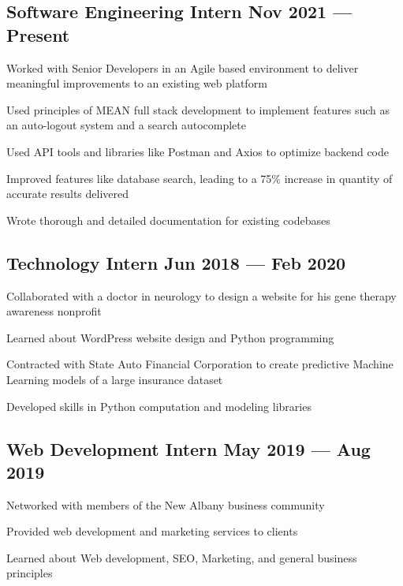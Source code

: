 \documentclass[letter,10pt]{article}
\begin{document}
\subsection{{Software Engineering Intern \hfill Nov 2021 --- Present}}
\begin{zitemize}
\item Worked with Senior Developers in an Agile based environment to deliver meaningful improvements to an existing web platform
\item Used principles of MEAN full stack development to implement features such as an auto-logout system and a search autocomplete 
\item Used API tools and libraries like Postman and Axios to optimize backend code
\item Improved features like database search, leading to a 75\% increase in quantity of accurate results delivered
\item Wrote thorough and detailed documentation for existing codebases
\end{zitemize}

\subsection{{Technology Intern \hfill Jun 2018 --- Feb 2020}}
\begin{zitemize}
\item Collaborated with a doctor in neurology to design a website for his gene therapy awareness nonprofit
\item Learned about WordPress website design and Python programming
\item Contracted with State Auto Financial Corporation to create predictive Machine Learning models of a large insurance dataset
\item Developed skills in Python computation and modeling libraries
\end{zitemize}

\subsection{{Web Development Intern \hfill May 2019 --- Aug 2019}}
\begin{zitemize}
\item Networked with members of the New Albany business community 
\item Provided web development and marketing services to clients
\item Learned about Web development, SEO, Marketing, and general business principles
\end{zitemize}
\end{document}
